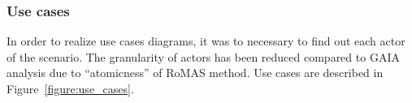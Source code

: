 \documentclass[a4paper,11pt]{report}
\begin{document}
  \subsubsection{Use cases}
   
  
  
  In order to realize use cases diagrams, it was to necessary to find out each actor 
  of the scenario. The granularity of actors has been reduced compared to GAIA analysis 
  due to ``atomicness'' of RoMAS method. Use cases are described in Figure~\ref{figure:use_cases}.
  
\end{document}
